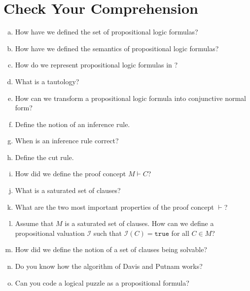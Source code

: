 \pagebreak


\section{Check Your Comprehension}
\begin{enumerate}[(a)]
\item How have we defined the set of propositional logic formulas?
\item How have we defined the semantics of propositional logic formulas?
\item How do we represent propositional logic formulas in \Fsharp?
\item What is a tautology?
\item How can we transform a propositional logic formula into conjunctive normal
      form?
\item Define the notion of an inference rule.
\item When is an inference rule correct?
\item Define the cut rule.
\item How did we define the proof concept $M \vdash C$?
\item What is a saturated set of clauses?
\item What are the two most important properties of the proof concept $\vdash$?
\item Assume that $M$ is a saturated set of clauses. How can we define a propositional valuation
      $\mathcal{I}$ such that $\mathcal{I}(C) = \mathtt{true}$ for all $C \in M$?
\item How did we define the notion of a set of clauses being solvable?
\item Do you know how the algorithm of Davis and Putnam works?
\item Can you code a logical puzzle as a propositional formula?
\end{enumerate}


%

